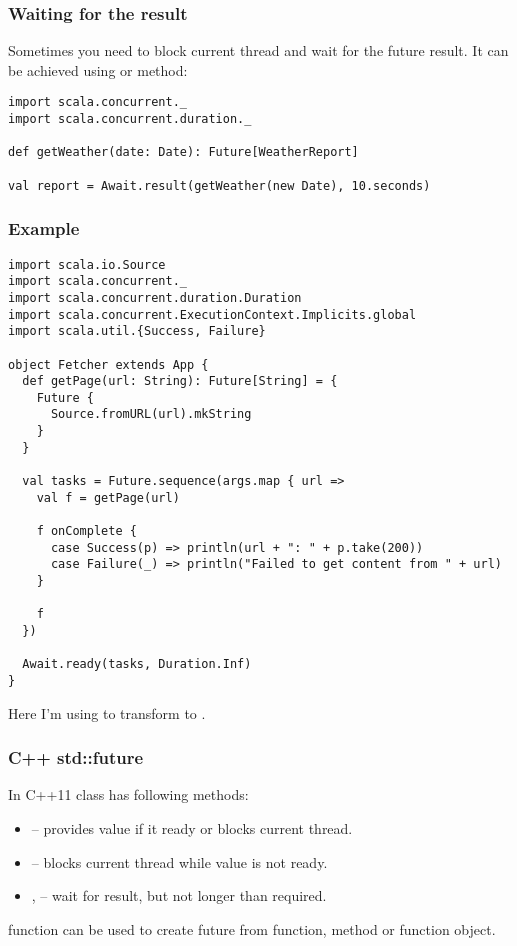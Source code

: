\begin{frame}[fragile]
\frametitle{Waiting for the result}
Sometimes you need to block current thread and wait for the future result.
It can be achieved using  or  method:
\begin{example}
\begin{lstlisting}
import scala.concurrent._
import scala.concurrent.duration._

def getWeather(date: Date): Future[WeatherReport]

val report = Await.result(getWeather(new Date), 10.seconds)
\end{lstlisting}
\end{example}
\end{frame}

\begin{frame}[fragile]
\frametitle{Example}
\begin{lstlisting}
import scala.io.Source
import scala.concurrent._
import scala.concurrent.duration.Duration
import scala.concurrent.ExecutionContext.Implicits.global
import scala.util.{Success, Failure}

object Fetcher extends App {
  def getPage(url: String): Future[String] = {
    Future {
      Source.fromURL(url).mkString
    }
  }

  val tasks = Future.sequence(args.map { url =>
    val f = getPage(url)

    f onComplete {
      case Success(p) => println(url + ": " + p.take(200))
      case Failure(_) => println("Failed to get content from " + url)
    }

    f
  })

  Await.ready(tasks, Duration.Inf)
}
\end{lstlisting}

Here I'm using  to transform  to
.
\end{frame}

\begin{frame}[fragile]
\frametitle{C++ std::future}
In C++11  class has following methods:
\begin{itemize}
\item {} -- provides value if it ready or blocks current thread.
\item {} -- blocks current thread while value is not ready.
\item {},  -- wait for result, but not longer than
required.
\end{itemize}
 function can be used to create future from function, method or function object.
\end{frame}

